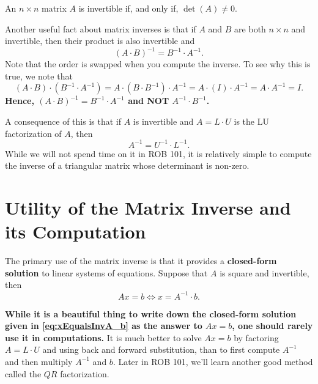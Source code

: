 \begin{tcolorbox}[sharp corners, colback=green!30, colframe=green!80!blue, title=\textbf{\large Major Important Fact}]
 {\large An $n \times n$ matrix $A$ is invertible if, and only if, $\det(A)\neq 0.$}
\end{tcolorbox}

Another useful fact about matrix inverses is that if $A$ and $B$ are both $n\times n$ and invertible, then their product is also invertible and
$$ \boxed{(A \cdot B)^{-1}=B^{-1} \cdot A^{-1}.} $$
Note that the order is swapped when you compute the inverse. To see why this is true, we note that
$$ (A\cdot B) \cdot (B^{-1} \cdot A^{-1}) =   A\cdot (B \cdot B^{-1})  \cdot A^{-1} = A\cdot (I)  \cdot A^{-1} = A\cdot A^{-1} = I.$$
\textbf{Hence, $(A\cdot B)^{-1} = B^{-1} \cdot A^{-1}$ and NOT $ A^{-1} \cdot B^{-1}$.}\\

\begin{tcolorbox}[title=\textbf{LU and Matrix Inverses}]
A consequence of this is that if $A$ is invertible and $A= L \cdot U$ is the LU factorization of $A$, then $$A^{-1} = U^{-1} \cdot L^{-1}. $$
While we will not spend time on it in ROB 101, it is relatively simple to  compute the inverse of a triangular matrix whose determinant is non-zero.

\end{tcolorbox}



\section{Utility of the Matrix Inverse and its Computation}
\label{sec:UtilityMatrixInverse}

The primary use of the matrix inverse is that it provides a \textbf{closed-form solution} to linear systems of equations. Suppose that $A$ is square and invertible, then 
\vspace*{0.2cm}
\begin{equation}
\label{eq:xEqualsInvA_b}
   \boxed{ Ax=b \iff x = A^{-1} \cdot b.} 
\end{equation}
\vspace*{0.2cm}

\textbf{While it is a beautiful thing to write down the closed-form solution given in  \eqref{eq:xEqualsInvA_b} as the answer to $Ax=b$, one should rarely use it in computations.} It is much better to solve $Ax=b$ by factoring $A=L \cdot U$ and using back and forward substitution, than to first compute $A^{-1}$ and then multiply $A^{-1}$ and $b$. Later in ROB 101, we'll learn another good method called the $QR$ factorization. \\

